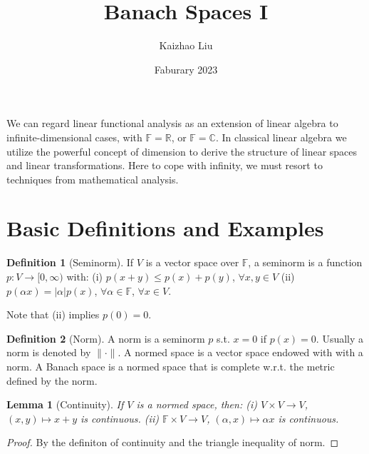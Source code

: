 \documentclass{article}
\title{Banach Spaces I}
\author{Kaizhao Liu}
\date{Faburary 2023}
\newtheorem{lemma}{Lemma}[section]
\theoremstyle{definition}
\newtheorem{definition}{Definition}[section]
\begin{document}
\maketitle

We can regard linear functional analysis as an extension of linear algebra to infinite-dimensional cases,
with $\mathbb{F}=\mathbb{R}$, or $\mathbb{F}=\mathbb{C}$.
In classical linear algebra we utilize the powerful concept of dimension to derive the structure of linear spaces and linear transformations.
Here to cope with infinity, we must resort to techniques from mathematical analysis.

\tableofcontents




\section{Basic Definitions and Examples}
\begin{definition}[Seminorm]
    If $V$ is a vector space over $\mathbb{F}$, a seminorm is a function $p:V\to [0,\infty)$ with:\newline 
    (i) $p(x+y)\le p(x)+p(y)$, $\forall x,y\in V$ \newline
    (ii) $p(\alpha x)=\left|\alpha\right|p(x)$, $\forall \alpha\in \mathbb{F}$, $\forall x\in V$.
\end{definition}
Note that (ii) implies $p(0)=0$.
\begin{definition}[Norm]
    A norm is a seminorm $p$ s.t. $x=0$ if $p(x)=0$. Usually a norm is denoted by $\|\cdot\|$.
    A normed space is a vector space endowed with with a norm. A Banach space is a normed space that is complete w.r.t. the metric defined by the norm.
\end{definition}

\begin{lemma}[Continuity]
    If $V$ is a normed space, then: \newline 
    (i) $V\times V\to V$, $(x,y)\mapsto x+y$ is continuous. \newline
    (ii) $\mathbb{F}\times V\to V$, $(\alpha,x)\mapsto \alpha x$ is continuous.
\end{lemma}
\begin{proof}
    By the definiton of continuity and the triangle inequality of norm.
\end{proof}
\end{document}
